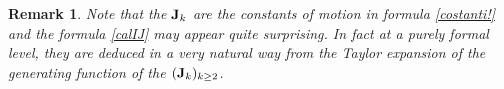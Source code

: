 \documentclass[reqno,11pt]{amsart}
\theoremstyle{plain}
\numberwithin{equation}{section}
\newtheorem{remark}[theorem]{Remark}
\renewcommand{\H}{\mathcal{H}}
\newcommand{\I}{{\texttt{\bf J}}}
\begin{document}
\begin{remark}
	Note that the  $\I_k$ are the constants of motion in formula \eqref{costanti!}
 and the formula \eqref{calIJ} may appear  quite surprising. In fact at a purely formal level, they are deduced in a very natural way from the Taylor expansion of the generating function of the $(\I_k)_{k\geq 2}$.
\end{remark}
%
%
\end{document}
